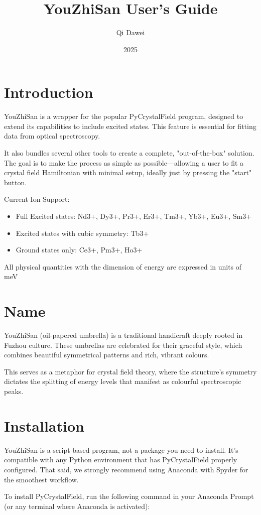 \documentclass{article}
\title{YouZhiSan User's Guide}
\date{2025}
\author{Qi Dawei}
\begin{document}
\maketitle

\section{Introduction}
YouZhiSan is a wrapper for the popular PyCrystalField\cite{scheiePyCrystalFieldSoftwareCalculation2021} program, designed to extend its capabilities to include excited states. This feature is essential for fitting data from optical spectroscopy.

It also bundles several other tools to create a complete, "out-of-the-box" solution. The goal is to make the process as simple as possible—allowing a user to fit a crystal field Hamiltonian with minimal setup, ideally just by pressing the "start" button.

Current Ion Support:
\begin{itemize}
\item Full Excited states: Nd3+, Dy3+, Pr3+, Er3+, Tm3+, Yb3+, Eu3+, Sm3+
\item Excited states with cubic symmetry: Tb3+
\item Ground states only: Ce3+, Pm3+, Ho3+
\end{itemize}
All physical quantities with the dimension of energy are expressed in units of meV
\section{Name}
YouZhiSan (oil-papered umbrella) is a traditional handicraft deeply rooted in Fuzhou culture. These umbrellas are celebrated for their graceful style, which combines beautiful symmetrical patterns and rich, vibrant colours.

This serves as a metaphor for crystal field theory, where the structure's symmetry dictates the splitting of energy levels that manifest as colourful spectroscopic peaks.
\section{Installation}
YouZhiSan is a script-based program, not a package you need to install. It’s compatible with any Python environment that has PyCrystalField properly configured. That said, we strongly recommend using Anaconda with Spyder for the smoothest workflow.

To install PyCrystalField, run the following command in your Anaconda Prompt (or any terminal where Anaconda is activated):
\end{document}
